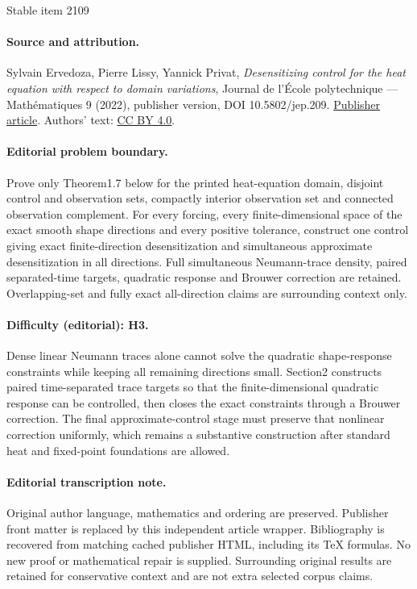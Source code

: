 \documentclass[11pt]{article}
\numberwithin{equation}{section}
\theoremstyle{definition}
\begin{document}
\begin{center}{\Large Stable item 2109}\end{center}
\paragraph{Source and attribution.}
Sylvain Ervedoza, Pierre Lissy, Yannick Privat, \emph{Desensitizing control for the heat equation with respect to domain variations}, Journal de l’École polytechnique — Mathématiques 9 (2022), publisher version, DOI 10.5802/jep.209. \href{https://jep.centre-mersenne.org/articles/10.5802/jep.209/}{Publisher article}. Authors' text: \href{https://creativecommons.org/licenses/by/4.0/}{CC BY 4.0}.
\paragraph{Editorial problem boundary.}
Prove only Theorem1.7 below for the printed heat-equation domain, disjoint control and observation sets, compactly interior observation set and connected observation complement. For every forcing, every finite-dimensional space of the exact smooth shape directions and every positive tolerance, construct one control giving exact finite-direction desensitization and simultaneous approximate desensitization in all directions. Full simultaneous Neumann-trace density, paired separated-time targets, quadratic response and Brouwer correction are retained. Overlapping-set and fully exact all-direction claims are surrounding context only.
\paragraph{Difficulty (editorial): H3.}
Dense linear Neumann traces alone cannot solve the quadratic shape-response constraints while keeping all remaining directions small. Section2 constructs paired time-separated trace targets so that the finite-dimensional quadratic response can be controlled, then closes the exact constraints through a Brouwer correction. The final approximate-control stage must preserve that nonlinear correction uniformly, which remains a substantive construction after standard heat and fixed-point foundations are allowed.
\paragraph{Editorial transcription note.}
Original author language, mathematics and ordering are preserved. Publisher front matter is replaced by this independent article wrapper. Bibliography is recovered from matching cached publisher HTML, including its TeX formulas. No new proof or mathematical repair is supplied. Surrounding original results are retained for conservative context and are not extra selected corpus claims.
\clearpage
\end{document}
